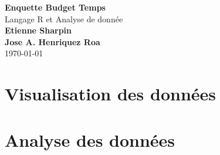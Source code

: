\documentclass[11pt]{article}
\begin{document}
\begin{titlepage}
  \begin{center}
    \vspace*{1cm} \Huge \textbf{Enquette Budget Temps}\\
    \vspace*{1\baselineskip} Langage R et Analyse de donnée\\
    \vspace*{2\baselineskip} \large
    \vfill \normalsize \textbf{Etienne Sharpin}\\ \textbf{Jose
      A. Henriquez Roa}\\
    \vspace*{2\baselineskip} \today \rhead{\today}
    \newpage
    \normalsize \tableofcontents
    \newpage
  \end{center}
\end{titlepage}
\section{Visualisation des données}
\section{Analyse des données}
\end{document}
